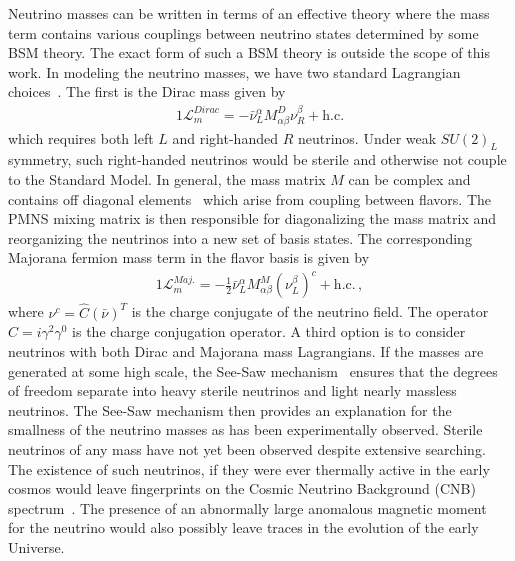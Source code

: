 \documentclass[universe,article,submit,moreauthors,pdftex,a4paper]{Definitions/mdpi}
\begin{document}
Neutrino masses can be written in terms of an effective theory where the mass term contains various couplings between neutrino states determined by some BSM theory. The exact form of such a BSM theory is outside the scope of this work. In modeling the neutrino masses, we have two standard Lagrangian choices~\cite{Giunti:2014ixa}. The first is the Dirac mass given by
\begin{alignat}{1}
	\label{DiracMass} \mathcal{L}_{m}^{Dirac} = -\bar{\nu}^{\alpha}_{L}M^{D}_{\alpha\beta}\nu^{\beta}_{R}+\mathrm{h.c.}
\end{alignat}
which requires both left $L$ and right-handed $R$ neutrinos. Under weak $SU(2)_{L}$ symmetry, such right-handed neutrinos would be sterile and otherwise not couple to the Standard Model. In general, the mass matrix $M$ can be complex and contains off diagonal elements~\cite{Fritzsch:1999ee,giunti2007fundamentals,Fritzsch:2015gxa} which arise from coupling between flavors. The PMNS mixing matrix is then responsible for diagonalizing the mass matrix and reorganizing the neutrinos into a new set of basis states. The corresponding Majorana fermion mass term in the flavor basis is given by
\begin{alignat}{1}
	\label{Majorana} \mathcal{L}_{m}^{Maj.} = -\frac{1}{2}\bar{\nu}^{\alpha}_{L}M^{M}_{\alpha\beta}(\nu^{\beta}_{L})^{c}+\mathrm{h.c.}\,,
\end{alignat}
where $\nu^{c} = \hat{C}(\bar{\nu})^{T}$ is the charge conjugate of the neutrino field. The operator $\hat{C} = i\gamma^{2}\gamma^{0}$ is the charge conjugation operator. A third option is to consider neutrinos with both Dirac and Majorana mass Lagrangians. If the masses are generated at some high scale, the See-Saw mechanism~\cite{Arkani-Hamed:1998wuz,Ellis:1999my,Casas:2001sr} ensures that the degrees of freedom separate into heavy sterile neutrinos and light nearly massless neutrinos. The See-Saw mechanism then provides an explanation for the smallness of the neutrino masses as has been experimentally observed. Sterile neutrinos of any mass have not yet been observed despite extensive searching. The existence of such neutrinos, if they were ever thermally active in the early cosmos would leave fingerprints on the Cosmic Neutrino Background (CNB) spectrum~\cite{Birrell:2014qna}. The presence of an abnormally large anomalous magnetic moment~\cite{Morgan:1981zy,Fukugita:1987uy,Vogel:1989iv,Elmfors:1997tt,Giunti:2008ve,Giunti:2014ixa,Canas:2015yoa} for the neutrino would also possibly leave traces in the evolution of the early Universe.
\end{document}
